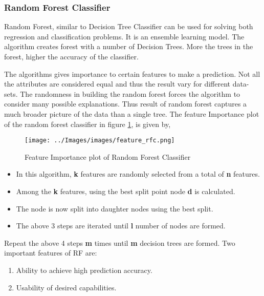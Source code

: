 \documentclass[conference]{IEEEtran}
\begin{document}
\subsubsection*{Random Forest Classifier}
Random Forest, similar to Decision Tree Classifier can be used for solving both regression and classification problems. It is an ensemble learning model. \cite{rf}  The algorithm creates forest with a number of Decision Trees. More the trees in the forest, higher the accuracy of the classifier.
\par

The algorithms gives importance to certain features to make a prediction. Not all the attributes are considered equal and thus the result vary for different data-sets. The randomness in building the random forest forces the algorithm to consider many possible explanations. Thus result of random forest captures a much broader picture of the data than a single tree. The feature Importance plot of the random forest classifier in figure \ref{rfc}, is given by,
%
\begin{figure}[ht!]
	\centering
	\texttt{[image: ../Images/images/feature\_rfc.png]}
    \caption{Feature Importance plot of Random Forest Classifier}
	\label{rfc}
\end{figure}
\par
\begin{itemize}
\item In this algorithm, \textbf{k} features are randomly selected from a total of \textbf{n} features.
\item Among the \textbf{k} features, using the best split point node \textbf{d} is calculated.
\item The node is now split into daughter nodes using the best split.
\item The above 3 steps are iterated until \textbf{l} number of nodes are formed.
\end{itemize}
Repeat the above 4 steps \textbf{m} times until \textbf{m} decision trees are formed. Two important features of RF are:
\begin{enumerate}
\item Ability to achieve high prediction accuracy.
\item Usability of desired capabilities.
\end{enumerate}
\end{document}
